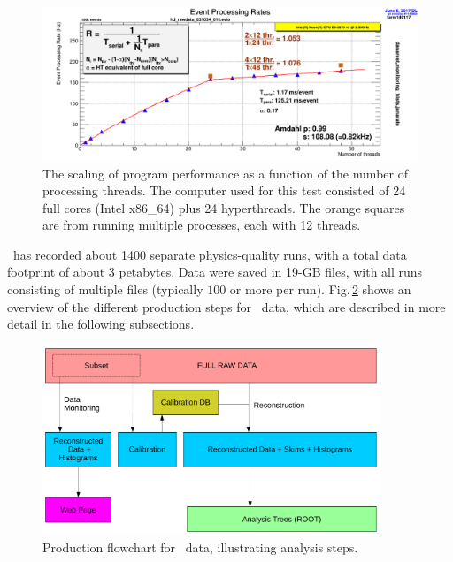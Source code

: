 \begin{figure}[h!]\centering
\includegraphics[width=1.0\textwidth]{figures/rate_vs_nthread.png}
\caption[]{\label{fig:offline_monitorA}The scaling of program performance as a function of the number of processing threads. The computer used for this test consisted of 24 full cores (Intel x86\_64) plus 24 hyperthreads. The orange squares are from running multiple processes, each with 12 threads.} 
\end{figure}

\GX~has recorded about 1400 separate physics-quality runs, with a total data footprint of about 3 petabytes. Data were saved in 19-GB files, with all runs consisting of multiple files (typically $100$ or more per run). Fig.\,\ref{fig:production_overview} shows an overview of the different production steps for \GX~data, which are described in more detail in the following subsections.

\begin{figure}[h!]\centering
\includegraphics[width=0.9\textwidth]{figures/production_overview_calib_v2.pdf}
\caption[]{\label{fig:production_overview}Production flowchart for \GX~data, illustrating analysis steps.} 
\end{figure}

